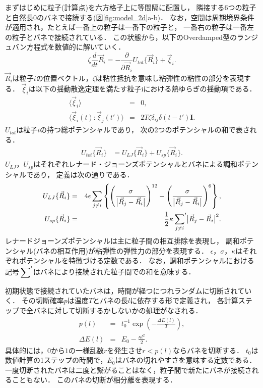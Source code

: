 まずはじめに粒子(計算点)を六方格子上に等間隔に配置し，
隣接する6つの粒子と自然長$0$のバネで接続する(図\ref{fig:model_2d}a-b)．
なお，空間は周期境界条件が適用され，たとえば一番上の粒子は一番下の粒子と，
一番右の粒子は一番左の粒子とバネで接続されている．
この状態から，以下のOverdamped型のランジュバン方程式を数値的に解いていく．
\begin{equation}
    \label{eq:main}
    \zeta
    \frac{d}{dt}
    \vec{R}_i
    =
    -\frac{\partial}{\partial\vec{R}_i}
    U_{tot}\{\vec{R}_i\}
    +\vec{\xi}_i
    .
\end{equation}
$\vec{R}_i$は粒子$i$の位置ベクトル，$\zeta$は粘性抵抗を意味し粘弾性の粘性の部分を表現する．
$\vec{\xi}_i$は以下の揺動散逸定理を満たす粒子iにおける熱ゆらぎの揺動項である．
\begin{eqnarray}
    \label{eq:langevin0}
    \langle\vec{\xi}_i\rangle &=& 0, \\
    \label{eq:langevin1}
    \langle\vec{\xi}_i(t):\vec{\xi}_j(t')\rangle &=& 2T\zeta\delta_{ij}\delta(t-t')\bm{I}.
\end{eqnarray}
$U_{tot}$は粒子$i$の持つ総ポテンシャルであり，
次の2つのポテンシャルの和で表される．
\begin{eqnarray}
    U_{tot}\{\vec{R}_i\}
    &=
     U_{LJ}\{\vec{R}_i\}
    +U_{sp}\{\vec{R}_i\}.
\end{eqnarray}
$U_{LJ}$，$U_{sp}$はそれぞれレナード・ジョーンズポテンシャルとバネによる調和ポテンシャルであり，
定義は次の通りである．
\begin{eqnarray}
    U_{LJ}\{\vec{R}_i\}
    &=&
    4\epsilon\sum_{j\neq i}
    \left\{
    \left(
    \frac{\sigma}{\bigl|\vec{R}_j-\vec{R}_i\bigr|}
    \right)^{12}
    -
    \left(
    \frac{\sigma}{\bigl|\vec{R}_j-\vec{R}_i\bigr|}
    \right)^{6}
    \right\},
    \\
    U_{sp}\{\vec{R}_i\}
    &=&
    \frac{1}{2}
    \kappa
    \sideset{}{'}\sum_{j\neq i}
    \bigl|\vec{R}_j-\vec{R}_i\bigr|^{2}.
\end{eqnarray}
レナードジョーンズポテンシャルは主に粒子間の相互排除を表現し，
調和ポテンシャル(バネの相互作用)が粘弾性の弾性力の部分を表現する．
$\epsilon$，$\sigma$，$\kappa$はそれぞれポテンシャルを特徴づける定数である．
なお，調和ポテンシャルにおける記号$\sideset{}{'}\sum$はバネにより接続された粒子間での和を意味する．

初期状態で接続されていたバネは，時間が経つにつれランダムに切断されていく．
その切断確率$p$は温度$T$とバネの長$l$に依存する形で定義され，
各計算ステップで全バネに対して切断するかしないかの処理がなされる．
\begin{eqnarray}
    p(l)
    &=&
    t_0^{-1}
    \exp\left(-\frac{\Delta E(l)}{T}\right)
    ,\\
    \Delta E(l)
    &=&
    E_0-\frac{\kappa l^2}{2}
    .
\end{eqnarray}
具体的には，$0$から$1$の一様乱数$r$を発生させ$r<p(l)$ならバネを切断する．
$t_0$は数値計算の1ステップの時間で，$E_0$はバネの切れやすさを意味する定数である．
一度切断されたバネは二度と繋がることはなく，粒子間で新たにバネが接続されることもない．
このバネの切断が相分離を表現する．


